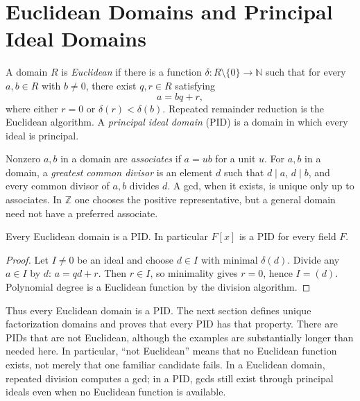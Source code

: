 \section{Euclidean Domains and Principal Ideal Domains}
\begin{definition}
A domain \(R\) is \emph{Euclidean} if there is a function
\(\delta:R\setminus\{0\}\to\mathbb N\) such that for every \(a,b\in R\)
with \(b\ne0\), there exist \(q,r\in R\) satisfying
\[
a=bq+r,
\]
where either \(r=0\) or \(\delta(r)<\delta(b)\). Repeated remainder
reduction is the Euclidean algorithm. A \emph{principal ideal domain} (PID)
is a domain in which every ideal is principal.
\end{definition}
\begin{definition}
Nonzero \(a,b\) in a domain are \emph{associates} if \(a=ub\) for a unit
\(u\).
For \(a,b\) in a domain, a \emph{greatest common divisor} is an element \(d\)
such that \(d\mid a\), \(d\mid b\), and every common divisor of \(a,b\)
divides \(d\).  A gcd, when it exists, is unique only up to associates.  In
\(\mathbb Z\) one chooses the positive representative, but a general domain
need not have a preferred associate.
\end{definition}
\begin{theorem} Every Euclidean domain is a PID.  In particular \(F[x]\) is a
PID for every field \(F\). \end{theorem}
\begin{proof} Let \(I\ne0\) be an ideal and choose \(d\in I\) with minimal
\(\delta(d)\).  Divide any \(a\in I\) by \(d\): \(a=qd+r\).  Then
\(r\in I\), so minimality gives \(r=0\), hence \(I=(d)\).  Polynomial degree
is a Euclidean function by the division algorithm. \end{proof}
\begin{remark}
Thus every Euclidean domain is a PID. The next section defines unique
factorization domains and proves that every PID has that property. There are
PIDs that are not Euclidean, although the examples are substantially longer
than needed here. In particular, ``not Euclidean'' means that no Euclidean
function exists, not merely that one familiar candidate fails. In a Euclidean
domain, repeated division computes a gcd; in a PID, gcds still exist through
principal ideals even when no Euclidean function is available.
\end{remark}

